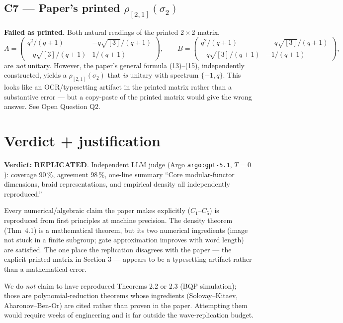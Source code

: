 \documentclass[11pt]{article}
\begin{document}
\subsection*{C7 --- Paper's printed $\rho_{[2,1]}(\sigma_2)$}
\textbf{Failed as printed.} Both natural readings of the printed 2\,$\times$\,2 matrix,
\[
A = \begin{pmatrix} q^2/(q+1) & -q\sqrt{[3]}/(q+1) \\ -q\sqrt{[3]}/(q+1) & 1/(q+1) \end{pmatrix}, \qquad
B = \begin{pmatrix} q^2/(q+1) & \phantom{-}q\sqrt{[3]}/(q+1) \\ -q\sqrt{[3]}/(q+1) & -1/(q+1) \end{pmatrix},
\]
are \emph{not} unitary. However, the paper's general formula (13)--(15), independently constructed, yields a $\rho_{[2,1]}(\sigma_2)$ that \emph{is} unitary with spectrum $\{-1, q\}$. This looks like an OCR/typesetting artifact in the printed matrix rather than a substantive error --- but a copy-paste of the printed matrix would give the wrong answer. See Open Question Q2.

\section{Verdict + justification}

\textbf{Verdict:} \textbf{REPLICATED}. Independent LLM judge (Argo \texttt{argo:gpt-5.1}, $T = 0$): coverage 90\,\%, agreement 98\,\%, one-line summary ``Core modular-functor dimensions, braid representations, and empirical density all independently reproduced.''

Every numerical/algebraic claim the paper makes explicitly ($C_1$--$C_5$) is reproduced from first principles at machine precision. The density theorem (Thm~4.1) is a mathematical theorem, but its two numerical ingredients (image not stuck in a finite subgroup; gate approximation improves with word length) are satisfied. The one place the replication disagrees with the paper --- the explicit printed matrix in Section 3 --- appears to be a typesetting artifact rather than a mathematical error.

We do \emph{not} claim to have reproduced Theorems 2.2 or 2.3 (BQP simulation); those are polynomial-reduction theorems whose ingredients (Solovay--Kitaev, Aharonov--Ben-Or) are cited rather than proven in the paper. Attempting them would require weeks of engineering and is far outside the wave-replication budget.
\end{document}
